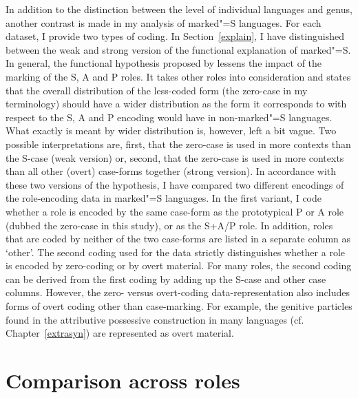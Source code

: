 In addition to the distinction between the level of individual languages and genus, another contrast is made in my analysis of marked"=S languages.
For each dataset, I provide two types of coding. 
In Section~\ref{explain}, I have distinguished between the weak and strong version of the functional explanation of marked"=S. 
In general, the functional hypothesis proposed by \citet{Koenig:2006} lessens the impact of the marking of the S, A and P roles. 
It takes other roles into consideration and states that the overall distribution of the less-coded form (the zero-case in my terminology) should have a wider distribution as the form it corresponds to with respect to the S, A and P encoding would have in non-marked"=S languages. 
What exactly is meant by wider distribution is, however, left a bit vague. 
Two possible interpretations are, first, that the zero-case is used in more contexts than the S-case (weak version) or, second, that the zero-case is used in more contexts than all other (overt) case-forms together (strong version). 
In accordance with these two versions of the hypothesis, I have compared two different encodings of the role-encoding data in marked"=S languages. 
In the first variant, I code whether a role is encoded by the same case-form as the prototypical P or A role (dubbed the zero-case in this study), or as the S+A/P role.
In addition, roles that are coded by neither of the two case-forms are listed in a separate column as `other'. 
The second coding used for the data strictly distinguishes whether a role is encoded by zero-coding or by overt material. 
For many roles, the second coding can be derived from the first coding by adding up the S-case and other case columns. 
However, the zero- versus overt-coding data-representation also includes forms of overt coding other than case-marking.
For example, the genitive particles found in the attributive possessive construction in many languages (cf. Chapter~\ref{extrasyn}) are represented as overt material.

\section{Comparison across roles}\label{rolestyp}

